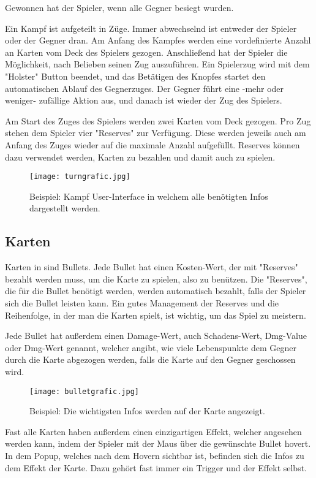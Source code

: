Gewonnen hat der Spieler, wenn alle Gegner besiegt wurden.


Ein Kampf ist aufgeteilt in Züge. Immer abwechselnd ist entweder der Spieler oder der Gegner dran. Am Anfang des Kampfes
werden eine vordefinierte Anzahl an Karten vom Deck des Spielers gezogen.
Anschließend hat der Spieler die Möglichkeit, nach Belieben seinen Zug auszuführen. Ein Spielerzug wird mit dem "Holster"
Button beendet, und das Betätigen des Knopfes startet den automatischen Ablauf des Gegnerzuges. Der Gegner führt eine -mehr
oder weniger- zufällige Aktion aus, und danach ist wieder der Zug des Spielers.


Am Start des Zuges des Spielers werden zwei Karten vom Deck gezogen. Pro Zug stehen dem Spieler vier "Reserves"
zur Verfügung. Diese werden jeweils auch am Anfang des Zuges wieder auf die maximale Anzahl aufgefüllt.
Reserves können dazu verwendet werden, Karten zu bezahlen und damit auch zu spielen.

\begin{figure}[H]
    \texttt{[image: turngrafic.jpg]}
    \caption{Beispiel: Kampf User-Interface in welchem alle benötigten Infos dargestellt werden.}
\end{figure}



\subsection{Karten}\label{Karten}
Karten in \FF sind Bullets. Jede Bullet hat einen Kosten-Wert, der mit "Reserves" bezahlt werden muss, um die Karte zu spielen, also zu benützen.
Die "Reserves", die für die Bullet benötigt werden, werden automatisch bezahlt, falls der Spieler sich die Bullet leisten kann.
Ein gutes Management der Reserves und die Reihenfolge, in der man die Karten spielt, ist wichtig, um das Spiel zu meistern.


Jede Bullet hat außerdem einen Damage-Wert, auch Schadens-Wert, Dmg-Value oder Dmg-Wert genannt, welcher angibt, wie viele Lebenspunkte dem Gegner
durch die Karte abgezogen werden, falls die Karte auf den Gegner geschossen wird.

\begin{figure}[H]
    \texttt{[image: bulletgrafic.jpg]}%
    \caption{Beispiel: Die wichtigsten Infos werden auf der Karte angezeigt.}
\end{figure}

Fast alle Karten haben außerdem einen einzigartigen Effekt,
welcher angesehen werden kann, indem der Spieler mit der Maus über die gewünschte Bullet hovert.
In dem Popup, welches nach dem Hovern sichtbar ist, befinden sich die Infos zu dem Effekt der Karte.
Dazu gehört fast immer ein Trigger und der Effekt selbst.


